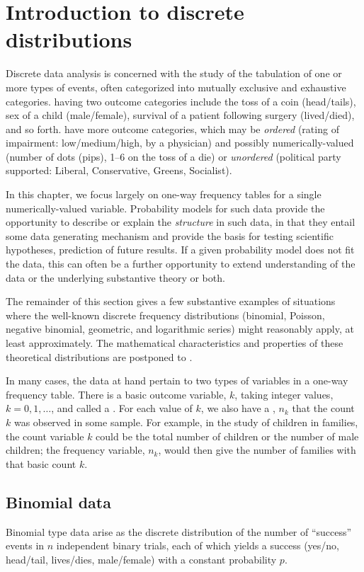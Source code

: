 \documentclass[10pt,krantz2]{krantz}\usepackage[]{graphicx}\usepackage[]{color}
\begin{document}
\section{Introduction to discrete distributions}\label{sec:discrete-intro}
Discrete data analysis is concerned with the study of the tabulation of one or
more types of events, often categorized into mutually exclusive and exhaustive
categories.   having two outcome categories include
the toss of a coin (head/tails), sex of a child (male/female), survival of
a patient following surgery (lived/died), and so forth.  
have more outcome categories, which may be \emph{ordered}
(rating of impairment: low/medium/high, by a physician)
and possibly numerically-valued
(number of dots (pips), 1--6 on the toss of a die)
or \emph{unordered} (political party supported: Liberal, Conservative, Greens, Socialist).

In this chapter, we focus largely on one-way frequency tables for a single
numerically-valued variable.
Probability models for such data provide the opportunity to describe or explain
the \emph{structure} in such data, in that they entail some data generating
mechanism and provide the basis for testing scientific hypotheses, prediction of
future results.  If a given probability model does not fit the data, this can often
be a further opportunity to extend understanding of the data or the underlying
substantive theory or both.

The remainder of this section gives a few substantive examples of situations where the
well-known discrete frequency distributions (binomial, Poisson, negative binomial,
geometric, and logarithmic series) might reasonably apply, at least approximately.
The mathematical characteristics and properties of these theoretical
distributions are postponed to .

In many cases, the data at hand pertain to two types of variables in a one-way
frequency table. There is a basic outcome variable, $k$, taking integer values,
$k = 0, 1, \dots$, and called a .  For each value of $k$, we also have
a , $n_k$ that the count $k$ was observed in some sample.
For example, in the study of children in families, the count variable
$k$ could be the total number of children or the number of male children;
the frequency variable, $n_k$, would then give the number of families with that
basic count $k$.

\subsection{Binomial data}\label{sec:binom-data}
Binomial type data arise as the discrete distribution of the number of
``success'' events in $n$ independent binary trials, each of which
yields a success (yes/no, head/tail, lives/dies, male/female) with a constant probability $p$.
\end{document}
